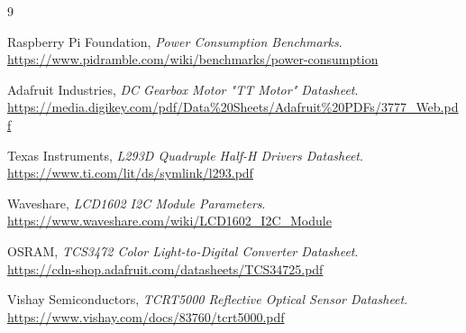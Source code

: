 \begin{thebibliography}{9}

Raspberry Pi Foundation, \textit{Power Consumption Benchmarks}. \\
\url{https://www.pidramble.com/wiki/benchmarks/power-consumption}

Adafruit Industries, \textit{DC Gearbox Motor "TT Motor" Datasheet}. \\
\url{https://media.digikey.com/pdf/Data%20Sheets/Adafruit%20PDFs/3777_Web.pdf}

Texas Instruments, \textit{L293D Quadruple Half-H Drivers Datasheet}. \\
\url{https://www.ti.com/lit/ds/symlink/l293.pdf}

Waveshare, \textit{LCD1602 I2C Module Parameters}. \\
\url{https://www.waveshare.com/wiki/LCD1602_I2C_Module}

OSRAM, \textit{TCS3472 Color Light-to-Digital Converter Datasheet}. \\
\url{https://cdn-shop.adafruit.com/datasheets/TCS34725.pdf}

 Vishay Semiconductors, \textit{TCRT5000 Reflective Optical Sensor Datasheet}. \\
\url{https://www.vishay.com/docs/83760/tcrt5000.pdf}

\end{thebibliography}

